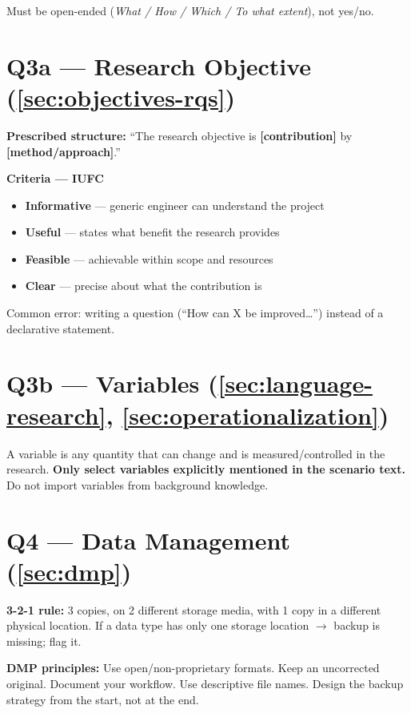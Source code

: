 \documentclass[../main.tex]{subfiles}
\begin{document}
Must be open-ended (\emph{What / How / Which / To what extent}), not yes/no.

\section*{Q3a — Research Objective (\autoref{sec:objectives-rqs})}

\textbf{Prescribed structure:} ``The research objective is \textbf{[contribution]} by \textbf{[method/approach]}.''

\textbf{Criteria — IUFC}
\begin{itemize}
  \item \textbf{Informative} — generic engineer can understand the project
  \item \textbf{Useful} — states what benefit the research provides
  \item \textbf{Feasible} — achievable within scope and resources
  \item \textbf{Clear} — precise about what the contribution is
\end{itemize}

Common error: writing a question (``How can X be improved\ldots'') instead of a declarative statement.

\section*{Q3b — Variables (\autoref{sec:language-research}, \autoref{sec:operationalization})}

A variable is any quantity that can change and is measured/controlled in the research. \textbf{Only select variables explicitly mentioned in the scenario text.} Do not import variables from background knowledge.

\section*{Q4 — Data Management (\autoref{sec:dmp})}

\textbf{3-2-1 rule:} 3 copies, on 2 different storage media, with 1 copy in a different physical location. If a data type has only one storage location $\to$ backup is missing; flag it.

\textbf{DMP principles:} Use open/non-proprietary formats. Keep an uncorrected original. Document your workflow. Use descriptive file names. Design the backup strategy from the start, not at the end.
\end{document}
